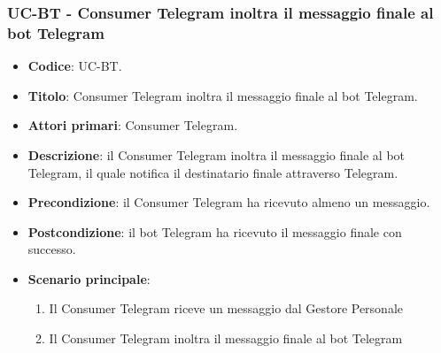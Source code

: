 \subsubsection{UC\theuccount-BT - Consumer Telegram inoltra il messaggio finale al bot Telegram}
	\begin{itemize}
		\item \textbf{Codice}: UC\theuccount-BT.
		\item \textbf{Titolo}: Consumer Telegram inoltra il messaggio finale al bot Telegram.
		\item \textbf{Attori primari}: Consumer Telegram.
		\item \textbf{Descrizione}: il Consumer Telegram inoltra il messaggio finale al bot Telegram, il quale notifica il destinatario finale attraverso Telegram.
		\item \textbf{Precondizione}: il Consumer Telegram ha ricevuto almeno un messaggio.
		\item \textbf{Postcondizione}: il bot Telegram ha ricevuto il messaggio finale con successo.
		\item \textbf{Scenario principale}: 
		\begin{enumerate}
			\item Il Consumer Telegram riceve un messaggio dal Gestore Personale
			\item Il Consumer Telegram inoltra il messaggio finale al bot Telegram
		\end{enumerate}
		
	\end{itemize}
